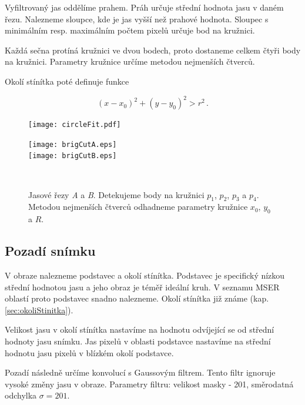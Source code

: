 Vyfiltrovaný jas oddělíme prahem. Práh určuje střední hodnota jasu v daném řezu. Nalezneme sloupce, kde je jas vyšší než prahové hodnota. Sloupec s minimálním resp. maximálním počtem pixelů určuje bod na kružnici.  

Každá sečna protíná kružnici ve dvou bodech, proto dostaneme celkem čtyři body na kružnici. Parametry kružnice určíme metodou nejmenších čtverců. 

Okolí stínítka poté definuje funkce 

\begin{equation}
	\left(x-x_0\right)^2 + \left(y-y_0\right)^2 > r^2\,.
	\label{eq:kruzniceOkoli}
	\end{equation}

\begin{figure}[htbp]
    \centering
    \begin{minipage}[c]{0.48\textwidth}
        \centering\texttt{[image: circleFit.pdf]}
    \end{minipage}
    \begin{minipage}[c]{0.48\textwidth}
        \centering\texttt{[image: brigCutA.eps]}\\
        
        \centering\texttt{[image: brigCutB.eps]}
    \end{minipage}
    \\
        \caption[Detekce okolí stínítka.]{Jasové řezy \textit{A} a \textit{B}. Detekujeme body na kružnici $p_1$, $p_2$, $p_3$ a $p_4$. Metodou nejmenších čtverců odhadneme parametry kružnice $x_0$, $y_0$ a $R$.}
        \label{fig:CircleFit}
\end{figure}
	


\subsection{Pozadí snímku}
	V obraze nalezneme podstavec a okolí stínítka. Podstavec je specifický nízkou střední hodnotou jasu a jeho obraz je téměř ideální kruh. V seznamu MSER oblastí proto podstavec snadno nalezneme. Okolí stínítka již známe (kap. \ref{sec:okoliStinitka}).
	
	Velikost jasu v okolí stínítka nastavíme na hodnotu odvíjející se od střední hodnoty jasu snímku. Jas pixelů v oblasti podstavce nastavíme na střední hodnotu jasu pixelů v blízkém okolí podstavce.  
	
	Pozadí následně určíme konvolucí s Gaussovým filtrem. Tento filtr ignoruje vysoké změny jasu v obraze. Parametry filtru: velikost masky - \SI{201}{\px}, směrodatná odchylka $\sigma = 201$.
	
